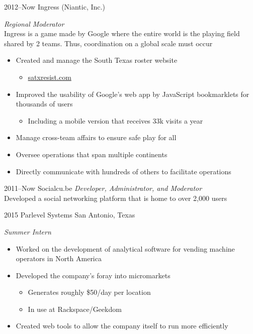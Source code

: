 \documentclass[]{friggeri-cv} %
\begin{document}

\begin{entrylist}

	\entry
	{2012--Now}
	{Ingress (Niantic, Inc.)}
	{}
	{\emph{Regional Moderator} \\
		Ingress is a game made by Google where the entire world is the playing field shared by 2 teams. Thus, coordination on a global scale must occur
		\begin{itemize}
			\item Created and manage the South Texas roster website
				\begin{itemize}
					\item \href{http://satxresist.com}{satxresist.com}
				\end{itemize}
			\item Improved the usability of Google's web app by JavaScript bookmarklets for thousands of users
				\begin{itemize}
					\item Including a mobile version that receives 33k visits a year
				\end{itemize}
			\item Manage cross-team affairs to ensure safe play for all
			\item Oversee operations that span multiple continents
			\item Directly communicate with hundreds of others to facilitate operations
		\end{itemize}
	}

	\entry
	{2011--Now}
	{Socialcu.be}
	{}
	{\emph{Developer, Administrator, and Moderator} \\
	Developed a social networking platform that is home to over 2,000 users}


	\entry
	{2015}
	{Parlevel Systems}
	{San Antonio, Texas}
	{\emph{Summer Intern}
		\begin{itemize}
			\item Worked on the development of analytical software for vending machine operators in North America
			\item Developed the company's foray into micromarkets
				\begin{itemize}
					\item Generates roughly \$50/day per location
					\item In use at Rackspace/Geekdom
				\end{itemize}
			\item Created web tools to allow the company itself to run more efficiently
		\end{itemize}
	}


\end{entrylist}
\end{document}

